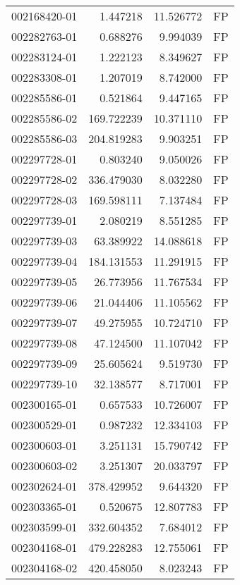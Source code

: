 \begin{tabular}{lrrl}
002168420-01 &    1.447218 &      11.526772 &   FP \\
002282763-01 &    0.688276 &       9.994039 &   FP \\
002283124-01 &    1.222123 &       8.349627 &   FP \\
002283308-01 &    1.207019 &       8.742000 &   FP \\
002285586-01 &    0.521864 &       9.447165 &   FP \\
002285586-02 &  169.722239 &      10.371110 &   FP \\
002285586-03 &  204.819283 &       9.903251 &   FP \\
002297728-01 &    0.803240 &       9.050026 &   FP \\
002297728-02 &  336.479030 &       8.032280 &   FP \\
002297728-03 &  169.598111 &       7.137484 &   FP \\
002297739-01 &    2.080219 &       8.551285 &   FP \\
002297739-03 &   63.389922 &      14.088618 &   FP \\
002297739-04 &  184.131553 &      11.291915 &   FP \\
002297739-05 &   26.773956 &      11.767534 &   FP \\
002297739-06 &   21.044406 &      11.105562 &   FP \\
002297739-07 &   49.275955 &      10.724710 &   FP \\
002297739-08 &   47.124500 &      11.107042 &   FP \\
002297739-09 &   25.605624 &       9.519730 &   FP \\
002297739-10 &   32.138577 &       8.717001 &   FP \\
002300165-01 &    0.657533 &      10.726007 &   FP \\
002300529-01 &    0.987232 &      12.334103 &   FP \\
002300603-01 &    3.251131 &      15.790742 &   FP \\
002300603-02 &    3.251307 &      20.033797 &   FP \\
002302624-01 &  378.429952 &       9.644320 &   FP \\
002303365-01 &    0.520675 &      12.807783 &   FP \\
002303599-01 &  332.604352 &       7.684012 &   FP \\
002304168-01 &  479.228283 &      12.755061 &   FP \\
002304168-02 &  420.458050 &       8.023243 &   FP \\

\end{tabular}
